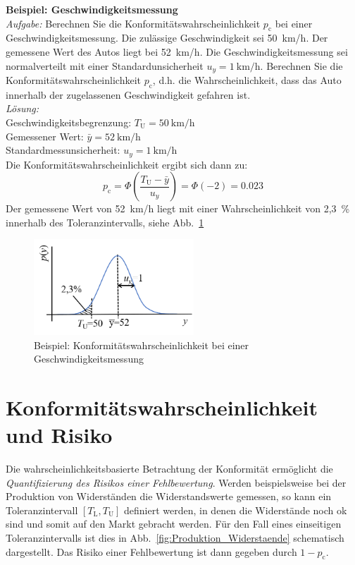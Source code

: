 \textbf{Beispiel: Geschwindigkeitsmessung} \\
\textsl{Aufgabe:} Berechnen Sie die Konformitätswahrscheinlichkeit $p_\mathrm{c}$ bei einer
Geschwindigkeitsmessung. Die zulässige Geschwindigkeit sei 50~km/h. Der gemessene Wert des Autos liegt bei 52~km/h. Die Geschwindigkeitsmessung sei normalverteilt mit einer Standardunsicherheit $u_y= 1~\mathrm{km/h}$. Berechnen Sie die Konformitätswahrscheinlichkeit
$p_\mathrm{c}$, d.h. die Wahrscheinlichkeit, dass das Auto innerhalb der zugelassenen Geschwindigkeit gefahren ist. \\
\textsl{Lösung:} \\
Geschwindigkeitsbegrenzung: $T_\mathrm{U} = 50~\textrm{km/h}$\\
Gemessener Wert: $\bar y = 52~\textrm{km/h}$ \\
Standardmessunsicherheit: $u_y = 1~\textrm{km/h} $ \\
Die Konformitätswahrscheinlichkeit ergibt sich dann zu:
\[
p_\mathrm{c} = \Phi \left( \frac{T_\mathrm{U}-\bar y}{u_y}\right) = \Phi(-2) = 0.023
\]
Der gemessene Wert von 52~km/h liegt mit einer Wahrscheinlichkeit von 2,3~\% innerhalb des To\-le\-ranz\-inter\-valls, siehe Abb.~\ref{fig:LoesungGeschwindigekeitsmessung}
\begin{figure}[!htp]
	\begin{center}
		\includegraphics[width=60mm]{05_vorlesung/media/Bsp_Geschwindigkeitsmessung.png}
		\caption{\label{fig:LoesungGeschwindigekeitsmessung} Beispiel: Konformitätswahrscheinlichkeit bei einer Geschwindigkeitsmessung}
	\end{center}
\end{figure}

\section{Konformitätswahrscheinlichkeit und Risiko}
Die wahrscheinlichkeitsbasierte Betrachtung der Konformität ermöglicht die \textsl{Quantifizierung des Risikos einer Fehlbewertung}. Werden beispielsweise bei der Produktion von Widerständen die Widerstandswerte gemessen, so kann ein Toleranzintervall $[T_\mathrm{L}, T_\mathrm{U}]$ definiert werden, in denen die Widerstände noch ok sind und somit auf den Markt gebracht werden. Für den Fall eines einseitigen Toleranzintervalls ist dies in Abb.~\ref{fig:Produktion_Widerstaende} schematisch
dargestellt. Das Risiko einer Fehlbewertung ist dann gegeben durch $1- p_\mathrm{c}$.\\

